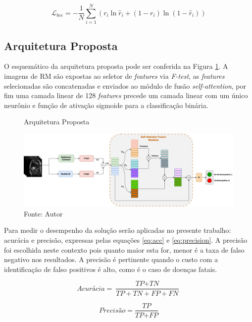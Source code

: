 \begin{equation}
\mathcal{L}_{bce} = -\frac{1}{N} \sum_{i=1}^N
(r_i \ln \hat{r}_i + (1 - r_i) \ln (1 - \hat{r}_i))
\label{eq:bce}
\end{equation}

\subsection{Arquitetura Proposta}
\label{subsec:cap4_arquitetura_proposta}

O esquemático da arquitetura proposta pode ser conferida na Figura \ref{fig:fig011}. A imagens de \gls{RM} são expostas ao seletor de \textit{features} via \textit{F-test}, as \textit{features} selecionadas são concatenadas e enviados ao módulo de fusão \textit{self-attention}, por fim uma camada linear de 128 \textit{features} precede um camada linear com um único neurônio e função de ativação sigmoide para a classificação binária.

\begin{figure}[htbp]
    \centering
    \caption{Arquitetura Proposta}
    \includegraphics[width=1\textwidth]{figures/fig011.png}
    \caption*{Fonte: Autor}
    \label{fig:fig011}
\end{figure}

Para medir o desempenho da solução serão aplicadas no presente trabalho: acurácia e precisão, expressas pelas equações \ref{eq:acc} e \ref{eq:precision}. A precisão foi escolhida neste contexto pois quanto maior esta for, menor é a taxa de falso negativo nos resultados. A precisão é pertinente quando o custo com a identificação de falso positivos é alto, como é o caso de doenças fatais.

\begin{equation}
\textit{Acurácia} = \frac{\textit{TP} + \textit{TN}}{\textit{TP} + \textit{TN} + \textit{FP} + \textit{FN}}
\label{eq:acc}
\end{equation}

\begin{equation}
\textit{Precisão} = \frac{\textit{TP}}{\textit{TP} + \textit{FP}}
\label{eq:precision}
\end{equation}



